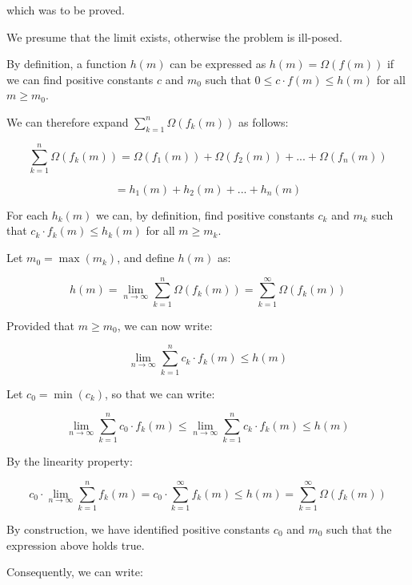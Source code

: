 \documentclass[a4paper,12pt]{article}
\begin{document}
which was to be proved. 

\vspace{5mm}

We presume that the limit exists, otherwise the problem is ill-posed. 

By definition, a function $h(m)$ can be expressed as $h(m) = \Omega(f(m))$ if we can find positive constants $c$ and $m_0$ such that $0 \le c\cdot f(m) \le h(m)$ for all $m \ge m_0$.

We can therefore expand $\sum_{k=1}^n \Omega(f_k(m))$ as follows:

\[ \sum_{k=1}^n \Omega(f_k(m)) = \Omega(f_1(m)) + \Omega(f_2(m)) + ... + \Omega(f_n(m)) \]

\[ = h_1(m) + h_2(m) + ... + h_n(m) \]

For each $h_k(m)$ we can, by definition, find positive constants $c_k$ and $m_k$ such that $c_k \cdot f_k(m) \le h_k(m)$ for all $m \ge m_k$.

Let $m_0 = \max(m_k)$, and define $h(m)$ as:

\[ h(m) = \lim_{n \rightarrow \infty} \sum_{k=1}^n \Omega\left(f_k(m)\right) = \sum_{k=1}^\infty \Omega\left( f_k(m)\right) \]

Provided that $m \ge m_0$, we can now write:

\[ \lim_{n \rightarrow \infty} \sum_{k=1}^n c_k \cdot f_k(m) \le h(m) \]

Let $c_0 = \min(c_k)$, so that we can write:

\[  \lim_{n \rightarrow \infty} \sum_{k=1}^n c_0 \cdot f_k(m) \le \lim_{n \rightarrow \infty} \sum_{k=1}^n c_k \cdot f_k(m) \le h(m) \]

By the linearity property: 

\[ c_0 \cdot \lim_{n \rightarrow \infty} \sum_{k=1}^n f_k(m) =  c_0 \cdot \sum_{k=1}^\infty f_k(m) \le h(m) =  \sum_{k=1}^\infty \Omega (f_k(m))  \]

By construction, we have identified positive constants $c_0$ and $m_0$ such that the expression above holds true. 

Consequently, we can write:
\end{document}
